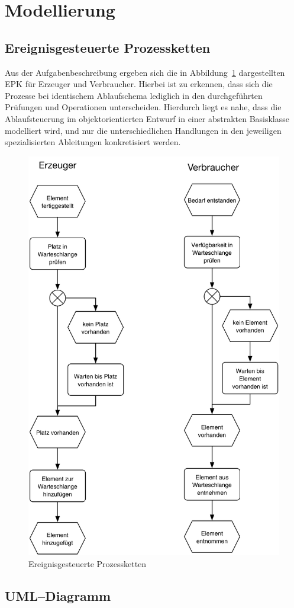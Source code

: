 \newpage
\section{Modellierung} %
\label{sec:modellierung}

\subsection{Ereignisgesteuerte Prozessketten} %
\label{sub:ereignisgesteuerte_prozessketten}

Aus der Aufgabenbeschreibung ergeben sich die in Abbildung~\ref{fig:epk} dargestellten \ac{EPK} für Erzeuger und Verbraucher. Hierbei ist zu erkennen, dass sich die Prozesse bei identischem Ablaufschema lediglich in den  durchgeführten Prüfungen und Operationen unterscheiden. Hierdurch liegt es nahe, dass die Ablaufsteuerung im objektorientierten Entwurf in einer abstrakten Basisklasse modelliert wird, und nur die unterschiedlichen Handlungen in den jeweiligen spezialisierten Ableitungen konkretisiert werden.

\begin{figure}[H]
\begin{center}
\includegraphics[width=.5\textwidth]{Erzeuger-Verbraucher-EPK.jpg}
\caption{Ereignisgesteuerte Prozessketten}
\label{fig:epk}
\end{center}
\end{figure}


\subsection{UML–Diagramm} %

